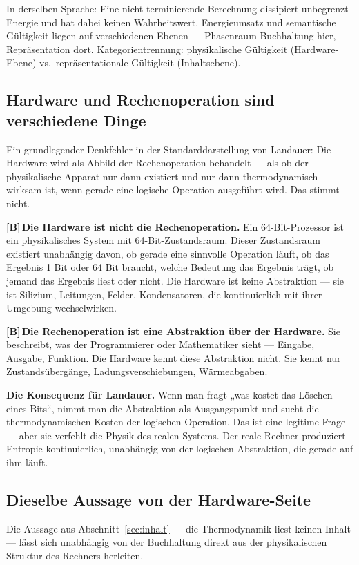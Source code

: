 \documentclass[11pt,a4paper]{article}
\newcommand{\LB}{\textcolor{layB}{\textbf{\footnotesize\textsf{[B]}}}\,}
\begin{document}
In derselben Sprache: Eine nicht-terminierende Berechnung dissipiert unbegrenzt
Energie und hat dabei keinen Wahrheitswert. Energieumsatz und semantische
Gültigkeit liegen auf verschiedenen Ebenen --- Phasenraum-Buchhaltung hier,
Repräsentation dort. Kategorientrennung: physikalische Gültigkeit
(Hardware-Ebene) vs.\ repräsentationale Gültigkeit (Inhaltsebene).

\subsection{Hardware und Rechenoperation sind verschiedene Dinge}

Ein grundlegender Denkfehler in der Standarddarstellung von Landauer: Die Hardware
wird als Abbild der Rechenoperation behandelt --- als ob der physikalische Apparat
nur dann existiert und nur dann thermodynamisch wirksam ist, wenn gerade eine
logische Operation ausgeführt wird. Das stimmt nicht.

\LB \textbf{Die Hardware ist nicht die Rechenoperation.} Ein 64-Bit-Prozessor ist
ein physikalisches System mit 64-Bit-Zustandsraum. Dieser Zustandsraum existiert
unabhängig davon, ob gerade eine sinnvolle Operation läuft, ob das Ergebnis 1 Bit
oder 64 Bit braucht, welche Bedeutung das Ergebnis trägt, ob jemand das Ergebnis
liest oder nicht. Die Hardware ist keine Abstraktion --- sie ist Silizium,
Leitungen, Felder, Kondensatoren, die kontinuierlich mit ihrer Umgebung
wechselwirken.

\LB \textbf{Die Rechenoperation ist eine Abstraktion über der Hardware.} Sie
beschreibt, was der Programmierer oder Mathematiker sieht --- Eingabe, Ausgabe,
Funktion. Die Hardware kennt diese Abstraktion nicht. Sie kennt nur
Zustandsübergänge, Ladungsverschiebungen, Wärmeabgaben.

\textbf{Die Konsequenz für Landauer.} Wenn man fragt „was kostet das Löschen eines
Bits“, nimmt man die Abstraktion als Ausgangspunkt und sucht die thermodynamischen
Kosten der logischen Operation. Das ist eine legitime Frage --- aber sie verfehlt
die Physik des realen Systems. Der reale Rechner produziert Entropie
kontinuierlich, unabhängig von der logischen Abstraktion, die gerade auf ihm
läuft.

\subsection{Dieselbe Aussage von der Hardware-Seite}

Die Aussage aus Abschnitt~\ref{sec:inhalt} --- die Thermodynamik liest keinen
Inhalt --- lässt sich unabhängig von der Buchhaltung direkt aus der physikalischen
Struktur des Rechners herleiten.
\end{document}
